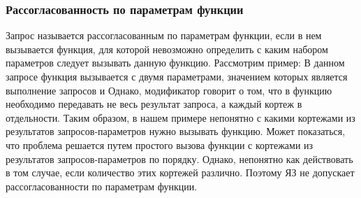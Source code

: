 \subsubsection{Рассогласованность по параметрам функции}
Запрос называется рассогласованным по параметрам функции, если в нем вызывается
функция, для которой невозможно определить с каким набором параметров следует вызывать данную функцию.
Рассмотрим пример:
В данном запросе функция вызывается с двумя параметрами, значением которых является
выполнение запросов
и
Однако, модификатор \cl{\#} говорит о том, что в функцию необходимо передавать не весь результат
запроса, а каждый кортеж в отдельности. Таким образом, в 
нашем примере непонятно с какими кортежами из результатов запросов-параметров нужно вызывать
функцию. Может показаться, что проблема решается путем простого вызова функции с кортежами из результатов 
запросов-параметров по порядку. Однако, непонятно как действовать в том случае, если 
количество этих кортежей различно. Поэтому ЯЗ не допускает рассогласованности по параметрам функции.







